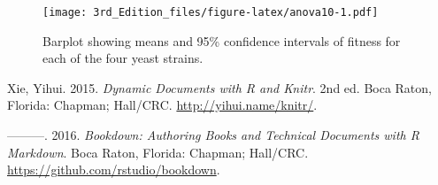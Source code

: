 \documentclass[
]{book}
\begin{document}
\begin{figure}
\centering
\texttt{[image: 3rd\_Edition\_files/figure-latex/anova10-1.pdf]}
\caption{\label{fig:anova10}Barplot showing means and 95\% confidence intervals of fitness for each of the four yeast strains.}
\end{figure}

\hypertarget{refs}{}
\leavevmode\hypertarget{ref-xie2015}{}%
Xie, Yihui. 2015. \emph{Dynamic Documents with R and Knitr}. 2nd ed. Boca Raton, Florida: Chapman; Hall/CRC. \url{http://yihui.name/knitr/}.

\leavevmode\hypertarget{ref-xie2016}{}%
---------. 2016. \emph{Bookdown: Authoring Books and Technical Documents with R Markdown}. Boca Raton, Florida: Chapman; Hall/CRC. \url{https://github.com/rstudio/bookdown}.
\end{document}
